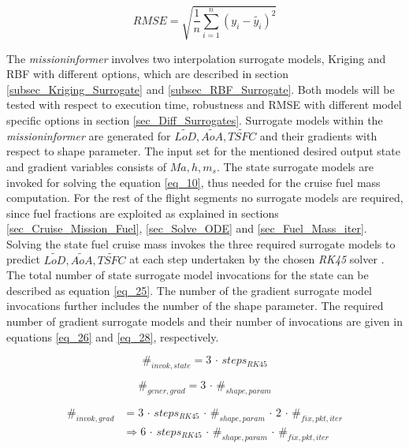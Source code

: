 \begin{equation}
    \label{eq_24}
    RMSE = \sqrt{\frac{1}{n} \sum_{i=1}^{n} (y_i - \tilde{y_i})^2}
\end{equation}

The \emph{missioninformer} involves two interpolation surrogate 
models, Kriging and RBF with different options, which are 
described in section \ref{subsec_Kriging_Surrogate} and 
\ref{subsec_RBF_Surrogate}. Both models will be tested
with respect to execution time, robustness and RMSE 
with different model specific options
in section \ref{sec_Diff_Surrogates}. Surrogate models 
within the \emph{missioninformer} are generated for 
$\tilde{LoD}, \tilde{AoA}, \tilde{TSFC}$
and their gradients with 
respect to shape parameter. The input set 
for the mentioned  desired output state and gradient 
variables consists of $Ma, h, m_s$. The state 
surrogate models are invoked for solving 
the equation \eqref{eq_10}, thus needed 
for the cruise fuel mass computation. For the rest of 
the flight segments no surrogate
models are required, since fuel fractions are 
exploited as explained in sections \ref{sec_Cruise_Mission_Fuel}, 
\ref{sec_Solve_ODE} and 
\ref{sec_Fuel_Mass_iter}. Solving the state fuel cruise mass 
invokes the three required surrogate models
to predict
$\tilde{LoD}, \tilde{AoA}, \tilde{TSFC}$  at each 
step undertaken by the chosen \emph{RK45} 
solver \cite{noauthor_scipys_2021}.
The total number 
of state surrogate model invocations for the 
state can be described as equation \eqref{eq_25}.
The number of the gradient surrogate model 
invocations further includes the number of the 
shape parameter. The required number of 
gradient surrogate models and their 
number 
of invocations are given in equations 
\eqref{eq_26} and \eqref{eq_28}, respectively. 

\begin{equation}
    \label{eq_25}
    \#_{invok,state} = 3\, \cdot\, steps_{RK45} 
\end{equation}

\begin{equation}
    \label{eq_26}
    \#_{gener,grad} = 3\, \cdot \,\#_{shape,param}
\end{equation}

\begin{equation}
    \label{eq_28}
    \begin{aligned}
        \#_{invok, grad} &= 3\, \cdot \,steps_{RK45} \, \cdot \, \#_{shape,param} \, 
        \cdot \, 2 \, \cdot \, \#_{fix,pkt,iter} \\
        &\Rightarrow 6\, \cdot \,steps_{RK45} \, \cdot \, \#_{shape,param} \, \cdot \, \#_{fix,pkt,iter}
    \end{aligned}
\end{equation}


